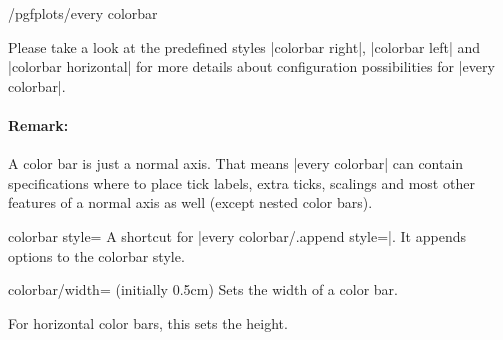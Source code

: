 \begin{stylekey}{/pgfplots/every colorbar}
\begin{codeexample}[]
\end{codeexample}

\begin{codeexample}[]
\end{codeexample}
    Please take a look at the predefined styles |colorbar right|,
    |colorbar left| and |colorbar horizontal| for more details about
    configuration possibilities for |every colorbar|.


    \paragraph{Remark:}

    A color bar is just a normal axis. That means |every colorbar| can contain
    specifications where to place tick labels, extra ticks, scalings and most
    other features of a normal axis as well (except nested color bars).
\end{stylekey}

\begin{pgfplotskey}{colorbar style=}
    A shortcut for |every colorbar/.append style=|. It
    appends options to the colorbar style.
\end{pgfplotskey}

\begin{pgfplotskey}{colorbar/width= (initially 0.5cm)}
    Sets the width of a color bar.
\pgfplotsexpensiveexample
\begin{codeexample}[]
\end{codeexample}

    For horizontal color bars, this sets the height.
\end{pgfplotskey}

